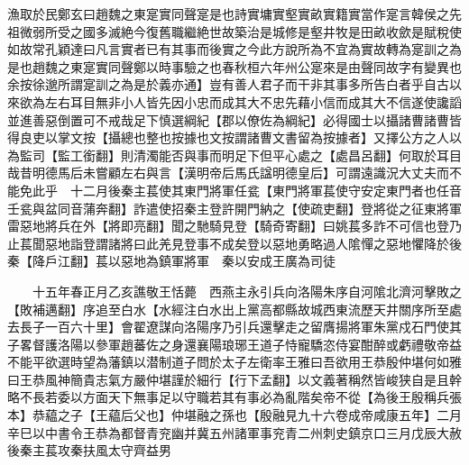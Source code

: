 漁取於民鄭玄曰趙魏之東寔實同聲寔是也詩實墉實壑實畝實籍實當作寔言韓侯之先祖微弱所受之國多滅絶今復舊職繼絶世故築治是城修是壑井牧是田畝收歛是賦稅使如故常孔穎達曰凡言實者已有其事而後實之今此方說所為不宜為實故轉為寔訓之為是也趙魏之東寔實同聲鄭以時事驗之也春秋桓六年州公寔來是由聲同故字有變異也余按徐邈所謂寔訓之為是於義亦通】豈有善人君子而干非其事多所告白者乎自古以來欲為左右耳目無非小人皆先因小忠而成其大不忠先藉小信而成其大不信遂使讒謟並進善惡倒置可不戒哉足下慎選綱紀【郡以僚佐為綱紀】必得國士以攝諸曹諸曹皆得良吏以掌文按【攝總也整也按據也文按謂諸曹文書留為按據者】又擇公方之人以為監司【監工銜翻】則清濁能否與事而明足下但平心處之【處昌呂翻】何取於耳目哉昔明德馬后未嘗顧左右與言【漢明帝后馬氏諡明德皇后】可謂遠識況大丈夫而不能免此乎　十二月後秦主萇使其東門將軍任瓫【東門將軍萇使守安定東門者也任音壬瓫與盆同音蒲奔翻】詐遣使招秦主登許開門納之【使疏吏翻】登將從之征東將軍雷惡地將兵在外【將即亮翻】聞之馳騎見登【騎奇寄翻】曰姚萇多詐不可信也登乃止萇聞惡地詣登謂諸將曰此羌見登事不成矣登以惡地勇略過人隂憚之惡地懼降於後秦【降戶江翻】萇以惡地為鎮軍將軍　秦以安成王廣為司徒

　　十五年春正月乙亥譙敬王恬薨　西燕主永引兵向洛陽朱序自河隂北濟河擊敗之【敗補邁翻】序追至白水【水經注白水出上黨高都縣故城西東流歷天井關序所至處去長子一百六十里】會翟遼謀向洛陽序乃引兵還擊走之留膺揚將軍朱黨戍石門使其子畧督護洛陽以參軍趙蕃佐之身還襄陽琅琊王道子恃寵驕恣侍宴酣醉或虧禮敬帝益不能平欲選時望為藩鎮以潜制道子問於太子左衛率王雅曰吾欲用王恭殷仲堪何如雅曰王恭風神簡貴志氣方嚴仲堪謹於細行【行下孟翻】以文義著稱然皆峻狭自是且幹略不長若委以方面天下無事足以守職若其有事必為亂階矣帝不從【為後王殷稱兵張本】恭藴之子【王藴后父也】仲堪融之孫也【殷融見九十六卷成帝咸康五年】二月辛巳以中書令王恭為都督青兖幽并冀五州諸軍事兖青二州刺史鎮京口三月戊辰大赦　後秦主萇攻秦扶風太守齊益男

